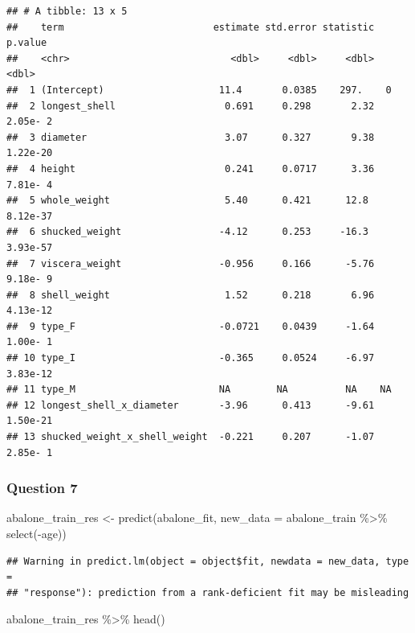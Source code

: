 \documentclass[
]{article}
\newenvironment{Shaded}{\begin{snugshade}}{\end{snugshade}}
\newcommand{\AttributeTok}[1]{\textcolor[rgb]{0.77,0.63,0.00}{#1}}
\newcommand{\FunctionTok}[1]{\textcolor[rgb]{0.00,0.00,0.00}{#1}}
\newcommand{\NormalTok}[1]{#1}
\newcommand{\OtherTok}[1]{\textcolor[rgb]{0.56,0.35,0.01}{#1}}
\newcommand{\SpecialCharTok}[1]{\textcolor[rgb]{0.00,0.00,0.00}{#1}}
\begin{document}
\begin{verbatim}
## # A tibble: 13 x 5
##    term                          estimate std.error statistic   p.value
##    <chr>                            <dbl>     <dbl>     <dbl>     <dbl>
##  1 (Intercept)                    11.4       0.0385    297.    0       
##  2 longest_shell                   0.691     0.298       2.32  2.05e- 2
##  3 diameter                        3.07      0.327       9.38  1.22e-20
##  4 height                          0.241     0.0717      3.36  7.81e- 4
##  5 whole_weight                    5.40      0.421      12.8   8.12e-37
##  6 shucked_weight                 -4.12      0.253     -16.3   3.93e-57
##  7 viscera_weight                 -0.956     0.166      -5.76  9.18e- 9
##  8 shell_weight                    1.52      0.218       6.96  4.13e-12
##  9 type_F                         -0.0721    0.0439     -1.64  1.00e- 1
## 10 type_I                         -0.365     0.0524     -6.97  3.83e-12
## 11 type_M                         NA        NA          NA    NA       
## 12 longest_shell_x_diameter       -3.96      0.413      -9.61  1.50e-21
## 13 shucked_weight_x_shell_weight  -0.221     0.207      -1.07  2.85e- 1
\end{verbatim}

\hypertarget{question-7}{%
\subsubsection{Question 7}\label{question-7}}

\begin{Shaded}
\begin{Highlighting}[]
\NormalTok{abalone\_train\_res }\OtherTok{\textless{}{-}} \FunctionTok{predict}\NormalTok{(abalone\_fit, }\AttributeTok{new\_data =}\NormalTok{ abalone\_train }\SpecialCharTok{\%\textgreater{}\%} \FunctionTok{select}\NormalTok{(}\SpecialCharTok{{-}}\NormalTok{age))}
\end{Highlighting}
\end{Shaded}

\begin{verbatim}
## Warning in predict.lm(object = object$fit, newdata = new_data, type =
## "response"): prediction from a rank-deficient fit may be misleading
\end{verbatim}

\begin{Shaded}
\begin{Highlighting}[]
\NormalTok{abalone\_train\_res }\SpecialCharTok{\%\textgreater{}\%} 
  \FunctionTok{head}\NormalTok{()}
\end{Highlighting}
\end{Shaded}
\end{document}
